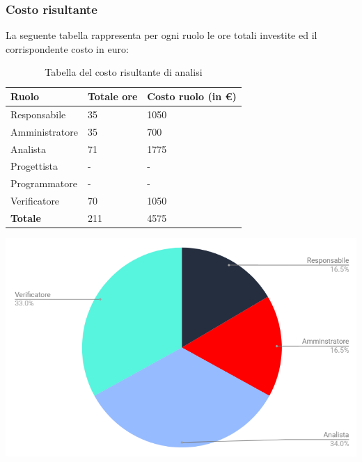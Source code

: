 \subsubsection{Costo risultante}
La seguente tabella rappresenta per ogni ruolo le ore totali investite ed il corrispondente costo in euro:
{
\renewcommand{\arraystretch}{2}
\begin{longtable}{ C{3cm} C{2cm} C{4cm}}
\caption{Tabella del costo risultante di analisi}\\
\rowcolor{\primaryColor}

\textcolor{\secondaryColor}{\textbf{Ruolo}} & 
\textcolor{\secondaryColor}{\textbf{Totale ore}} & 
\textcolor{\secondaryColor}{\textbf{Costo ruolo (in \euro{})}}\\	
\endhead

Responsabile    &  35 &  1050 \\
Amministratore  &  35 &  700 \\
Analista        &  71 & 1775 \\
Progettista     &   - &  - \\
Programmatore   &   - &  - \\
Verificatore    &  70 & 1050 \\
\textbf{Totale} & 211 & 4575 \\
		
\end{longtable}
}

\vskip 30pt %
\includegraphics[width=1\textwidth]{./src/Preventivo/src/img/TortaAnalisi.png}
